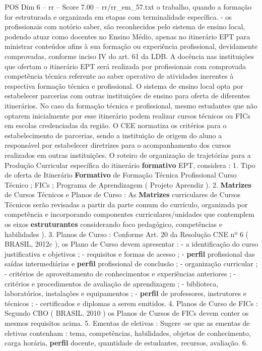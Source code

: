\begin{textsample}{POS Dim 6 – rr – Score 7.00 – rr/rr\_em\_57.txt}
o trabalho, quando a formação for estruturada e organizada em etapas com terminalidade específica. - os profissionais com notório saber, são reconhecidos pelo sistema de ensino local, podendo atuar como docentes no Ensino Médio, apenas no itinerário EPT para ministrar conteúdos afins à sua formação ou experiência profissional, devidamente comprovadas, conforme inciso IV do art. 61 da LDB.
A docência nas instituições que ofertam o itinerário EPT será realizada por profissionais com comprovada competência técnica referente ao saber operativo de atividades inerentes à respectiva formação técnica e profissional.
O sistema de ensino local opta por estabelecer parcerias com outras instituições de ensino para oferta de diferentes itinerários.
No caso da formação técnica e profissional, mesmo estudantes que não optarem inicialmente por esse itinerário podem realizar cursos técnicos ou FICs em escolas credenciadas da região.
O CEE normatiza os critérios para o estabelecimento de parcerias, sendo a instituição de origem do aluno a responsável por estabelecer diretrizes para o acompanhamento dos cursos realizados em outras instituições.
O roteiro de organização de trajetórias para a Produção Curricular específica do itinerário \textbf{formativo} EPT, considera : 1.
Tipo de oferta de Itinerário \textbf{Formativo} de Formação Técnica Profissional Curso Técnico ; FICs ; Programa de Aprendizagem ( Projeto Aprendiz ). 2. \textbf{Matrizes} de Cursos Técnicos e Planos de Curso : As \textbf{Matrizes} curriculares de Cursos Técnicos serão revisadas a partir da parte comum do currículo, organizada por competência e incorporando componentes curriculares/unidades que contemplem os eixos \textbf{estruturantes} considerando foco pedagógico, competências e habilidades ). 3.
Planos de Curso : Conforme Art. 20 da Resolução CNE nº 6 ( BRASIL, 2012c ), os Plano de Curso devem apresentar : - a identificação do curso justificativa e objetivos ; - requisitos e formas de acesso ; - \textbf{perfil} profissional das saídas intermediárias e \textbf{perfil} profissional de conclusão ; - organização curricular ; - critérios de aproveitamento de conhecimentos e experiências anteriores ; - critérios e procedimentos de avaliação de aprendizagem ; - biblioteca, laboratórios, instalações e equipamentos ; - \textbf{perfil} de professores, instrutores e técnicos ; - certificados e diplomas a serem emitidos. 4.
Planos de Curso de FICs : Segundo CBO ( BRASIL, 2010 ) os Planos de Cursos de FICs devem conter os mesmos requisitos acima. 5.
Ementas de eletivas : Sugere -se que as ementas de eletivas contenham : tema, competências, habilidades, objetos de conhecimento, carga horária, \textbf{perfil} docente, quantidade de estudantes, recursos, avaliação. 6.

\end{textsample}
